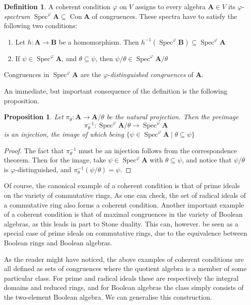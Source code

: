 \documentclass{article}
\theoremstyle{plain}
\newtheorem{proposition}[theorem]{Proposition}
\theoremstyle{definition}
\newtheorem{definition}{Definition}[section]
\newcommand{\Spec}{\operatorname{Spec}}
\begin{document}
\begin{definition}
    A coherent condition $\varphi$ on $V$ assigns to every algebra $\mathbf{A} \in V$ its $\varphi$-\textit{spectrum} $\Spec^\varphi\mathbf{A}\subseteq \operatorname{Con}\mathbf{A}$ of congruences.
    These spectra have to satisfy the following two conditions:
    \begin{enumerate}
        \item Let $h\colon \mathbf{A} \rightarrow \mathbf{B}$ be a homomorphism.
        Then $h^{-1}(\Spec^\varphi\mathbf{B}) \subseteq \Spec^\varphi\mathbf{A}$
        \item If $\psi \in \Spec^\varphi\mathbf{A}$, and $\theta \subseteq\psi$, then $\psi/\theta \in \Spec^\varphi\mathbf{A}/\theta$
    \end{enumerate}
    Congruences in $\Spec^\varphi\mathbf{A}$ are the $\varphi$-\textit{distinguished congruences} of $\mathbf{A}$.
\end{definition}

An immediate, but important consequence of the definition is the following proposition.

\begin{proposition} \label{prop:natprojisemb}
    Let $\pi_\theta \colon \mathbf{A}\rightarrow \mathbf{A}/\theta$ be the natural projection.
    Then the preimage
    $$\pi_\theta^{-1} \colon \Spec^\varphi\mathbf{A}/\theta \rightarrow \Spec^\varphi\mathbf{A}$$
    is an injection, the image of which being $\{ \psi \in \Spec^\varphi\mathbf{A} \mid \theta \subseteq \psi \}$
\end{proposition}
\begin{proof}
    The fact that $\pi_\theta^{-1}$ must be an injection follows from the correspondence theorem.
    Then for the image, take $\psi \in \Spec^\varphi\mathbf{A}$ with $\theta\subseteq\psi$, and notice that $\psi/\theta$ is $\varphi$-distinguished, and $\pi_\theta^{-1}(\psi/\theta) = \psi$.
\end{proof}


Of course, the canonical example of a coherent condition is that of prime ideals on the variety of commutative rings.
As one can check, the set of radical ideals of a commutative ring also forms a coherent condition.
Another important example of a coherent condition is that of maximal congruences in the variety of Boolean algebras, as this leads in part to Stone duality.
This can, however. be seen as a special case of prime ideals on commutative rings, due to the equivalence between Boolean rings and Boolean algebras. \cite{burris}\par
As the reader might have noticed, the above examples of coherent conditions are all defined as sets of congruences where the quotient algebra is a member of some particular class. 
For prime and radical ideals these are respectively the integral domains and reduced rings, and for Boolean algebras the class simply consists of the two-element Boolean algebra.
We can generalise this construction.
\end{document}
